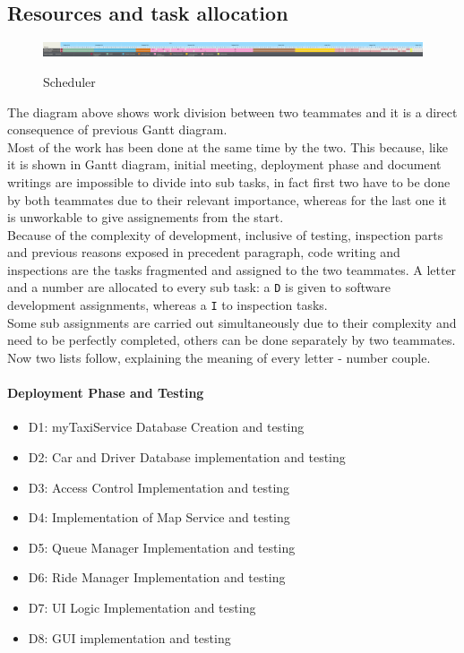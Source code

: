 \newpage
\begin{landscape}
\section{Resources and task allocation}
\begin{figure}[H]
\centering
\includegraphics[scale=0.25]{DiagramSources/Scheduler.png}
\label{Fig 2: }\caption{Scheduler}
\end{figure}
\end{landscape}
The diagram above shows work division between two teammates and it is a direct consequence of previous Gantt diagram. \\
Most of the work has been done at the same time by the two. This because, like it is shown in Gantt diagram, initial meeting, deployment phase and document writings are impossible to divide into sub tasks, in fact first two have to be done by both teammates due to their relevant importance, whereas for the last one it is unworkable to give assignements from the start.\\
Because of the complexity of development, inclusive of testing, inspection parts and previous reasons exposed in precedent paragraph, code writing and inspections are the tasks fragmented and assigned to the two teammates. A letter and a number are allocated to every sub task: a \texttt{D} is given to software development assignments, whereas a \texttt{I} to inspection tasks.\\
Some sub assignments are carried out simultaneously due to their complexity and need to be perfectly completed, others can be done separately by two teammates. \\
Now two lists follow, explaining the meaning of every letter - number couple.
\paragraph{Deployment Phase and Testing}
\begin{itemize}
\item D1: myTaxiService Database Creation and testing
\item D2: Car and Driver Database implementation and testing 
\item D3: Access Control Implementation and testing
\item D4: Implementation of Map Service and testing
\item D5: Queue Manager Implementation and testing
\item D6: Ride Manager Implementation and testing
\item D7: UI Logic Implementation and testing
\item D8: GUI implementation and testing
\end{itemize}  
